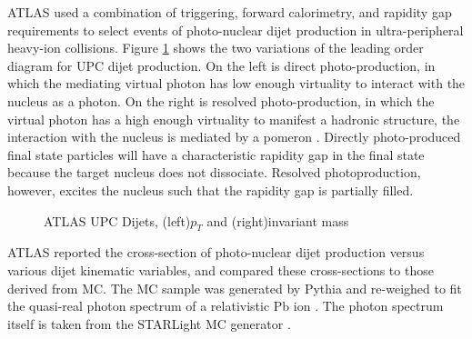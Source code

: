 ATLAS used a combination of triggering, forward calorimetry, and rapidity gap requirements to select events of photo-nuclear dijet production in ultra-peripheral heavy-ion collisions. Figure \ref{fig:exampleDijetAtlas} shows the two variations of the leading order diagram for UPC dijet production. On the left is direct photo-production, in which the mediating virtual photon has low enough virtuality to interact with the nucleus as a photon. On the right is resolved photo-production, in which the virtual photon has a high enough virtuality to manifest a hadronic structure, the interaction with the nucleus is mediated by a pomeron \cite{Donnachie:2002en}. Directly photo-produced final state particles will have a characteristic rapidity gap in the final state because the target nucleus does not dissociate. Resolved photoproduction, however, excites the nucleus such that the rapidity gap is partially filled. 

\begin{figure}[h!]
    \centering
    \qquad
    \caption{ATLAS UPC Dijets, (left)$p_T$ and (right)invariant mass \cite{Donnachie:2002en}}%
    \label{fig:exampleDijetAtlas}%
\end{figure}

ATLAS reported the cross-section of photo-nuclear dijet production versus various dijet kinematic variables, and compared these cross-sections to those derived from MC. The MC sample was generated by Pythia and re-weighed to fit the quasi-real photon spectrum of a relativistic Pb ion \cite{pythia}. The photon spectrum itself is taken from the STARLight MC generator \cite{Crittenden:1997yz}\cite{starlight}.
